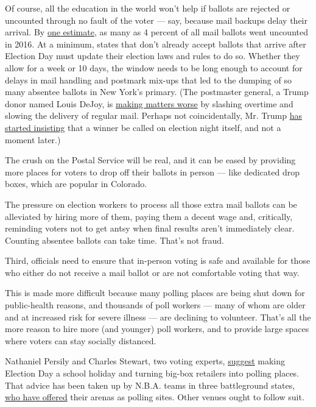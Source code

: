 Of course, all the education in the world won't help if ballots are
rejected or uncounted through no fault of the voter --- say, because
mail backups delay their arrival. By
\href{https://papers.ssrn.com/sol3/papers.cfm?abstract_id=3660625}{one
estimate}, as many as 4 percent of all mail ballots went uncounted in
2016. At a minimum, states that don't already accept ballots that arrive
after Election Day must update their election laws and rules to do so.
Whether they allow for a week or 10 days, the window needs to be long
enough to account for delays in mail handling and postmark mix-ups that
led to the dumping of so many absentee ballots in New York's primary.
(The postmaster general, a Trump donor named Louis DeJoy, is
\href{https://www.npr.org/2020/07/29/894799516/pending-postal-service-changes-could-delay-mail-and-deliveries-advocates-warn}{making
matters worse} by slashing overtime and slowing the delivery of regular
mail. Perhaps not coincidentally, Mr. Trump
\href{https://twitter.com/realDonaldTrump/status/1288933078287745024?s=20}{has
started insisting} that a winner be called on election night itself, and
not a moment later.)

The crush on the Postal Service will be real, and it can be eased by
providing more places for voters to drop off their ballots in person ---
like dedicated drop boxes, which are popular in Colorado.

The pressure on election workers to process all those extra mail ballots
can be alleviated by hiring more of them, paying them a decent wage and,
critically, reminding voters not to get antsy when final results aren't
immediately clear. Counting absentee ballots can take time. That's not
fraud.

Third, officials need to ensure that in-person voting is safe and
available for those who either do not receive a mail ballot or are not
comfortable voting that way.

This is made more difficult because many polling places are being shut
down for public-health reasons, and thousands of poll workers --- many
of whom are older and at increased risk for severe illness --- are
declining to volunteer. That's all the more reason to hire more (and
younger) poll workers, and to provide large spaces where voters can stay
socially distanced.

Nathaniel Persily and Charles Stewart, two voting experts,
\href{https://www.theatlantic.com/ideas/archive/2020/06/looming-threat-voting-person/613552/?utm_source=newsletter\&utm_medium=email\&utm_campaign=atlantic-daily-newsletter\&utm_content=20200701\&silverid-ref=NjEyOTYyMjM5Njg3S0}{suggest}
making Election Day a school holiday and turning big-box retailers into
polling places. That advice has been taken up by N.B.A. teams in three
battleground states,
\href{https://www.npr.org/2020/07/02/886566523/need-a-polling-place-with-social-distancing-3-nba-teams-offer-venues}{who
have offered} their arenas as polling sites. Other venues ought to
follow suit.

